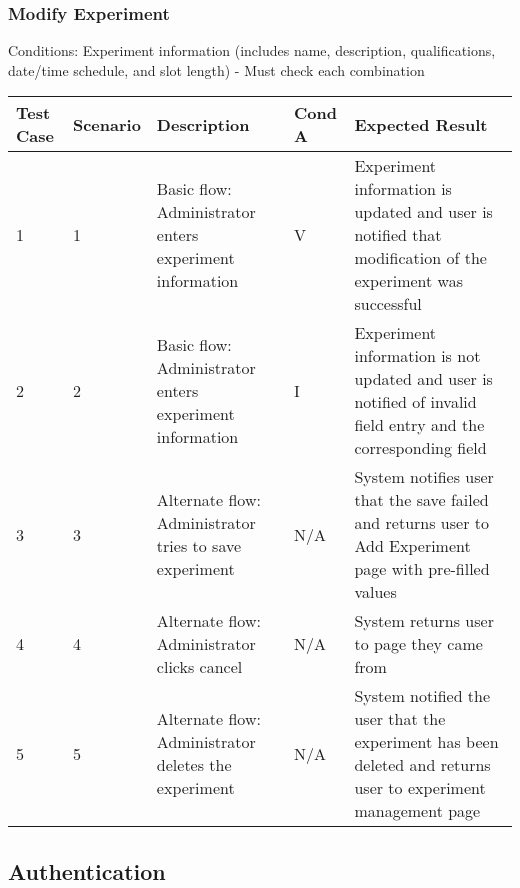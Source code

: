 \begin{landscape}
\subsubsection{Modify Experiment}
\begin{outline}[enumerate]
\1 [] Conditions:
\2 [A] Experiment information (includes name, description, qualifications, date/time schedule, and slot length) - Must check each combination
\end{outline}
\begin{table}[!h]
    \begin{tabular}{|l|l|p{3in}|l|p{3.25in}|}
        \hline
        Test Case & Scenario & Description & Cond A & Expected Result \\ \hline
        1 & 1 & Basic flow: Administrator enters experiment information & V & Experiment information is updated and user is notified that modification of the experiment was successful \\ \hline
        2 & 2 & Basic flow: Administrator enters experiment information & I & Experiment information is not updated and user is notified of invalid field entry and the corresponding field \\ \hline
        3 & 3 & Alternate flow: Administrator tries to save experiment & N/A & System notifies user that the save failed and returns user to Add Experiment page with pre-filled values \\ \hline
        4 & 4 & Alternate flow: Administrator clicks cancel & N/A & System returns user to page they came from \\ \hline
        5 & 5 & Alternate flow: Administrator deletes the experiment & N/A & System notified the user that the experiment has been deleted and returns user to experiment management page \\ \hline
    \end{tabular}
\end{table}

\clearpage
\subsection{Authentication}

\end{landscape}
